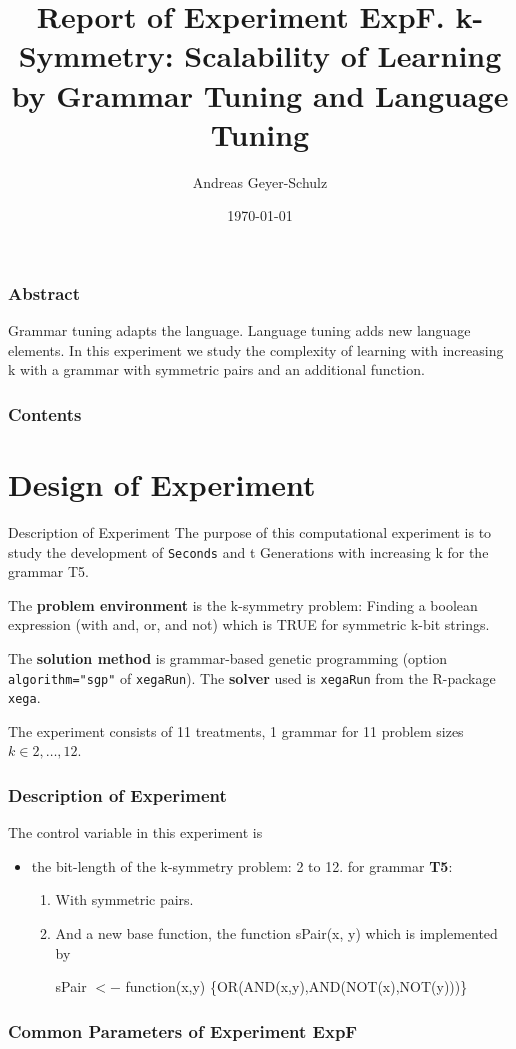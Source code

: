 \documentclass[18pt,c]{beamer}
\makeatletter
\let\beamer@writeslidentry@miniframeson=\beamer@writeslidentry
\newcommand*{\miniframeson}{\let\beamer@writeslidentry=\beamer@writeslidentry@miniframeson}
\makeatother
\begin{document}
\title{Report of Experiment ExpF. k-Symmetry: Scalability of Learning by Grammar Tuning and Language Tuning  }
\author{Andreas Geyer-Schulz}
\date{\today}
\begin{frame}
\titlepage
\end{frame}
\begin{frame}
\frametitle{Abstract}
Grammar tuning adapts the language. Language tuning adds new language elements. In this experiment we study the complexity of learning  with increasing k with a grammar with symmetric pairs and an additional function.%
\end{frame}
\begin{frame}[t, allowframebreaks]
\frametitle{Contents}
\tableofcontents[subsubsectionstyle=hide]
\vfill
\end{frame}
\miniframeson
\section{Design of Experiment}
\begin{frame}
\vspace*{2mm}
\begin{block}{
Description of Experiment
}
The purpose of this computational experiment is to study
the development of {\tt Seconds} and {	t Generations} with increasing k
for the grammar T5.
 
The {\bf problem environment} is the k-symmetry problem: 
Finding a boolean expression (with and, or, and not)
which is TRUE for symmetric k-bit strings.
 
The {\bf solution method} is grammar-based genetic programming
(option {\tt algorithm="sgp"}  of {\tt xegaRun}).
The {\bf solver} used is {\tt xegaRun} from the R-package {\tt xega}.
 
The experiment consists of 11 treatments, 1 grammar for 11 problem sizes $k\in 2,\dots, 12$.
\end{block}
\end{frame}%
\begin{frame}
\frametitle{
Description of Experiment
}
The control variable in this experiment is
\begin{itemize}
\item the bit-length of the k-symmetry problem: 2 to 12.
       for grammar {\bf T5}:
\begin{enumerate}
\item With symmetric pairs.
\item And a new base function,
       the function sPair(x, y) which is implemented by
 
 sPair $<-$ function(x,y) \{OR(AND(x,y),AND(NOT(x),NOT(y)))\}
\end{enumerate}
\end{itemize}
\end{frame}%
 \begin{frame}
 \fontsize{8pt}{9pt}\selectfont
 \frametitle{ Common Parameters of Experiment ExpF }

 \label{ExpFCommonTable000.tex}  
 \end{frame}
\end{document}
